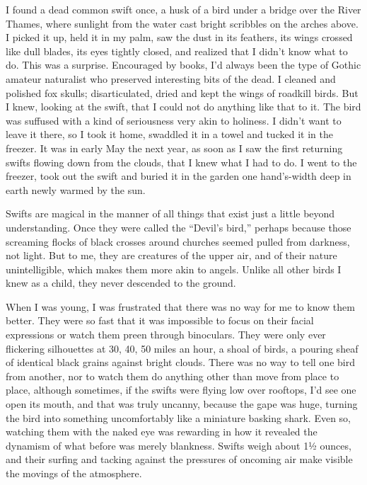 I found a dead common swift once, a husk of a bird under a bridge over
the River Thames, where sunlight from the water cast bright scribbles on
the arches above. I picked it up, held it in my palm, saw the dust in
its feathers, its wings crossed like dull blades, its eyes tightly
closed, and realized that I didn't know what to do. This was a surprise.
Encouraged by books, I'd always been the type of Gothic amateur
naturalist who preserved interesting bits of the dead. I cleaned and
polished fox skulls; disarticulated, dried and kept the wings of
roadkill birds. But I knew, looking at the swift, that I could not do
anything like that to it. The bird was suffused with a kind of
seriousness very akin to holiness. I didn't want to leave it there, so I
took it home, swaddled it in a towel and tucked it in the freezer. It
was in early May the next year, as soon as I saw the first returning
swifts flowing down from the clouds, that I knew what I had to do. I
went to the freezer, took out the swift and buried it in the garden one
hand's-width deep in earth newly warmed by the sun.

Swifts are magical in the manner of all things that exist just a little
beyond understanding. Once they were called the ``Devil's bird,''
perhaps because those screaming flocks of black crosses around churches
seemed pulled from darkness, not light. But to me, they are creatures of
the upper air, and of their nature unintelligible, which makes them more
akin to angels. Unlike all other birds I knew as a child, they never
descended to the ground.

When I was young, I was frustrated that there was no way for me to know
them better. They were so fast that it was impossible to focus on their
facial expressions or watch them preen through binoculars. They were
only ever flickering silhouettes at 30, 40, 50 miles an hour, a shoal of
birds, a pouring sheaf of identical black grains against bright clouds.
There was no way to tell one bird from another, nor to watch them do
anything other than move from place to place, although sometimes, if the
swifts were flying low over rooftops, I'd see one open its mouth, and
that was truly uncanny, because the gape was huge, turning the bird into
something uncomfortably like a miniature basking shark. Even so,
watching them with the naked eye was rewarding in how it revealed the
dynamism of what before was merely blankness. Swifts weigh about 1½
ounces, and their surfing and tacking against the pressures of oncoming
air make visible the movings of the atmosphere.

